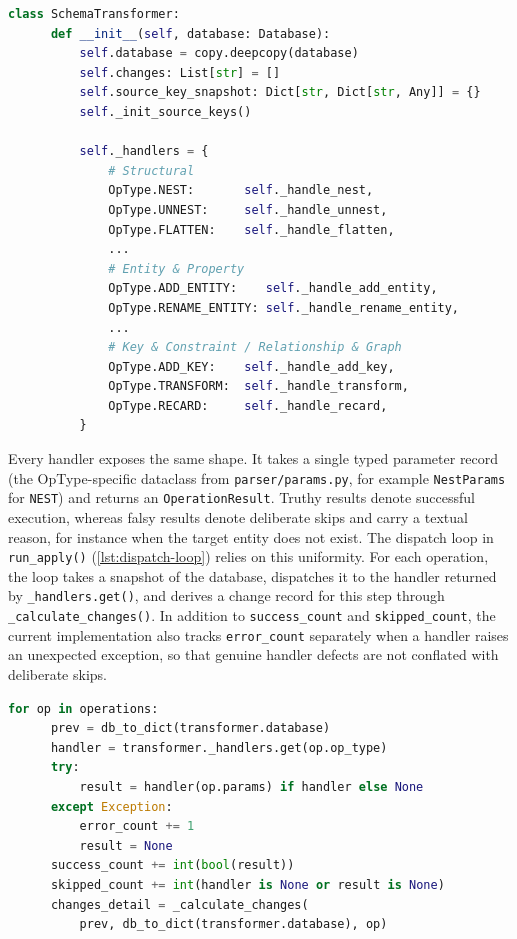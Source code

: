   \begin{lstlisting}[language=Python, basicstyle=\small\ttfamily,
    caption={Handler registry in \texttt{SchemaTransformer.\_\_init\_\_} (excerpt)},
    label={lst:handler-registry}]
  class SchemaTransformer:
      def __init__(self, database: Database):
          self.database = copy.deepcopy(database)
          self.changes: List[str] = []
          self.source_key_snapshot: Dict[str, Dict[str, Any]] = {}
          self._init_source_keys()

          self._handlers = {
              # Structural
              OpType.NEST:       self._handle_nest,
              OpType.UNNEST:     self._handle_unnest,
              OpType.FLATTEN:    self._handle_flatten,
              ...
              # Entity & Property
              OpType.ADD_ENTITY:    self._handle_add_entity,
              OpType.RENAME_ENTITY: self._handle_rename_entity,
              ...
              # Key & Constraint / Relationship & Graph
              OpType.ADD_KEY:    self._handle_add_key,
              OpType.TRANSFORM:  self._handle_transform,
              OpType.RECARD:     self._handle_recard,
          }
  \end{lstlisting}

  Every handler exposes the same shape. It takes a single typed parameter
  record (the OpType-specific dataclass from \texttt{parser/params.py},
  for example \texttt{NestParams} for \texttt{NEST}) and returns an \texttt{OperationResult}. Truthy results denote successful execution, whereas falsy results denote deliberate skips and carry a textual reason, for instance when the target entity does not exist. The dispatch loop in
  \texttt{run\_apply()} (\autoref{lst:dispatch-loop}) relies on this
  uniformity. For each operation, the loop takes a snapshot of the
  database, dispatches it to the handler returned by
  \texttt{\_handlers.get()}, and derives a change record for this step through \texttt{\_calculate\_changes()}. In addition to \texttt{success\_count} and \texttt{skipped\_count}, the current implementation also tracks \texttt{error\_count} separately when a handler raises an unexpected exception, so that genuine handler defects are not conflated with deliberate skips.

  \begin{lstlisting}[language=Python, basicstyle=\small\ttfamily,
    caption={Dispatch loop in \texttt{run\_apply()} (excerpt)},
    label={lst:dispatch-loop}]
  for op in operations:
      prev = db_to_dict(transformer.database)
      handler = transformer._handlers.get(op.op_type)
      try:
          result = handler(op.params) if handler else None
      except Exception:
          error_count += 1
          result = None
      success_count += int(bool(result))
      skipped_count += int(handler is None or result is None)
      changes_detail = _calculate_changes(
          prev, db_to_dict(transformer.database), op)
  \end{lstlisting}

